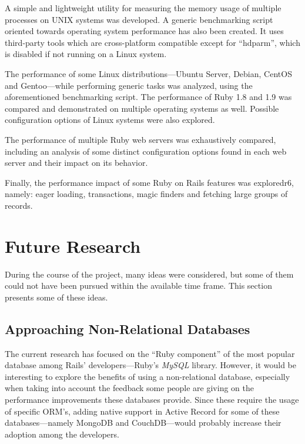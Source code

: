 A simple and lightweight utility for measuring the memory usage of multiple processes on UNIX systems was developed. A generic benchmarking script oriented towards operating system performance has also been created. It uses third-party tools which are cross-platform compatible except for ``hdparm'', which is disabled if not running on a Linux system.

The performance of some Linux distributions---Ubuntu Server, Debian, CentOS and Gentoo---while performing generic tasks was analyzed, using the aforementioned benchmarking script. The performance of Ruby 1.8 and 1.9 was compared and demonstrated on multiple operating systems as well. Possible configuration options of Linux systems were also explored.

The performance of multiple Ruby web servers was exhaustively compared, including an analysis of some distinct configuration options found in each web server and their impact on its behavior.

Finally, the performance impact of some Ruby on Rails features was exploredr6, namely: eager loading, transactions, magic finders and fetching large groups of records.

\section{Future Research}
During the course of the project, many ideas were considered, but some of them could not have been pursued within the available time frame. This section presents some of these ideas.

\subsection{Approaching Non-Relational Databases}
The current research has focused on the ``Ruby component'' of the most popular database among Rails' developers---Ruby's \textit{MySQL} library. However, it would be interesting to explore the benefits of using a non-relational database, especially when taking into account the feedback some people are giving on the performance improvements these databases provide. Since these require the usage of specific ORM's, adding native support in Active Record for some of these databases---namely MongoDB and CouchDB---would probably increase their adoption among the developers.

